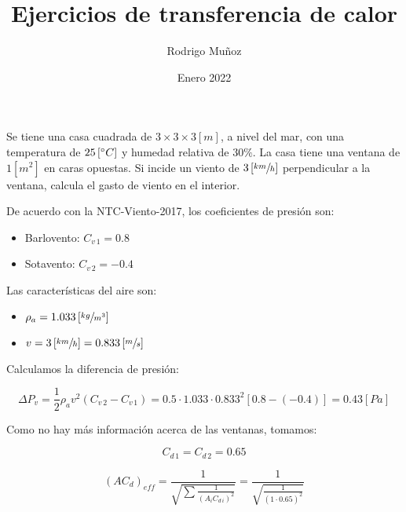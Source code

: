 \documentclass[11pt]{article}
\title{Ejercicios de transferencia de calor}
\author{Rodrigo Muñoz}
\date{Enero 2022}
\begin{document}
\maketitle

\section{}

Se tiene una casa cuadrada de $ 3 \times 3 \times 3 \left[ m \right] $, a nivel del mar, con una temperatura de $ 25 \left[ \degree C \right] $ y humedad relativa de $ 30\% $. La casa tiene una ventana de $ 1 \left[ m^2 \right] $ en caras opuestas. Si incide un viento de $ 3 \left[ \sfrac{ km }{ h } \right] $ perpendicular a la ventana, calcula el gasto de viento en el interior.

De acuerdo con la NTC-Viento-2017, los coeficientes de presión son:

\begin{itemize}
    \item
    Barlovento: $ C_{ v \, 1 } = 0.8 $
    
    \item
    Sotavento: $ C_{ v \, 2 } = -0.4 $

\end{itemize}

Las características del aire son:

\begin{itemize}
    \item
    $ \rho _a = 1.033 \left[ \sfrac{ kg }{ m^3 } \right] $
    
    \item
    $ v = 3 \left[ \sfrac{ km }{ h } \right] = 0.833 \left[ \sfrac{ m }{ s } \right] $

\end{itemize}

Calculamos la diferencia de presión:

\[ \Delta P_v = \frac{1}{2} \rho _a v^2 \left( C_{ v \, 2 } - C_{ v \, 1 } \right) = 0.5 \cdot 1.033 \cdot 0.833^2 \left[ 0.8 - \left( -0.4 \right) \right] = 0.43 \left[ Pa \right] \]

Como no hay más información acerca de las ventanas, tomamos:

\[ C_{ d \, 1 } = C_{ d \, 2 } = 0.65 \]

\[ \left( AC_d \right) _{ eff } = \frac{ 1 }{ \sqrt{ \sum{ \frac{ 1 }{ \left(  A_i C_{ d \, i } \right) ^2 } } } } = \frac{ 1 }{ \sqrt{ \frac{ 1 }{ \left( 1 \cdot 0.65 \right) ^2 } } } \]
\end{document}
